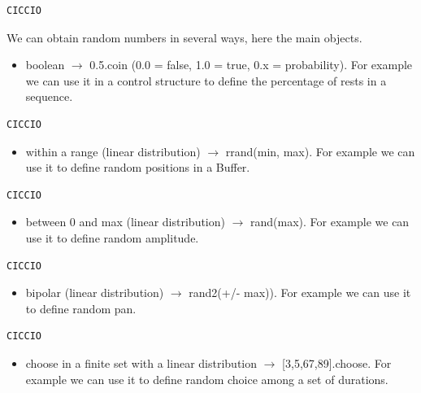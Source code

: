 \begin{lstlisting}[frame=single] 
CICCIO
\end{lstlisting}

We can obtain random numbers in several ways, here the main objects.

\begin{itemize}
\tightlist
\item boolean \(\rightarrow\) 0.5.coin (0.0 = false, 1.0 = true, 0.x = probability). For example we can use it in a control structure to define the percentage of rests in a sequence.
\end{itemize}

\begin{lstlisting}[frame=single] 
CICCIO
\end{lstlisting}

\begin{itemize}
\tightlist
\item within a range (linear distribution) \(\rightarrow\) rrand(min, max). For example we can use it to define random positions in a Buffer.
\end{itemize}

\begin{lstlisting}[frame=single] 
CICCIO
\end{lstlisting}

\begin{itemize}
\tightlist
\item between 0 and max (linear distribution) \(\rightarrow\) rand(max). For example we can use it to define random amplitude.
\end{itemize}

\begin{lstlisting}[frame=single] 
CICCIO
\end{lstlisting}

\begin{itemize}
\tightlist
\item bipolar (linear distribution) \(\rightarrow\) rand2(+/- max)). For example we can use it to define random pan.
\end{itemize}

\begin{lstlisting}[frame=single] 
CICCIO
\end{lstlisting}

\begin{itemize}
\tightlist
\item choose in a finite set with a linear distribution \(\rightarrow\)
  {[}3,5,67,89{]}.choose. For example we can use it to define random
  choice among a set of durations.
\end{itemize}

